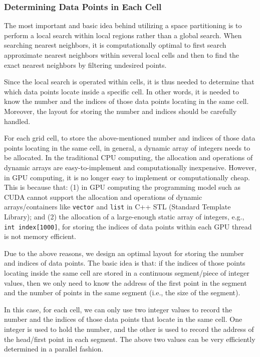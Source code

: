 \documentclass[final,5p,times,twocolumn,authoryear]{elsarticle}
\begin{document}
			\subsubsection{Determining Data Points in Each Cell}
			
			The most important and basic idea behind utilizing a space partitioning is 
			to perform a local search within local regions rather than a global search. 
			When searching nearest neighbors, it is computationally optimal to first 
			search approximate nearest neighbors within several local cells and then to 
			find the exact nearest neighbors by filtering undesired points. 
			
			Since the local search is operated within cells, it is thus needed to 
			determine that which data points locate inside a specific cell. In other 
			words, it is needed to know the number and the indices of those data points 
			locating in the same cell. Moreover, the layout for storing the number and 
			indices should be carefully handled.
			
			For each grid cell, to store the above-mentioned number and indices of those 
			data points locating in the same cell, in general, a dynamic array of 
			integers needs to be allocated. In the traditional CPU computing, the 
			allocation and operations of dynamic arrays are easy-to-implement and 
			computationally inexpensive. However, in GPU computing, it is no longer easy 
			to implement or computationally cheap. This is because that: (1) in GPU 
			computing the programming model such as CUDA cannot support the allocation 
			and operations of dynamic arrays/containers like \texttt{vector} and \texttt{list} in C++ STL 
			(Standard Template Library); and (2) the allocation of a large-enough static 
			array of integers, e.g., \texttt{int index[1000]}, for storing the indices of data 
			points within each GPU thread is not memory efficient. 
			
			Due to the above reasons, we design an optimal layout for storing the number 
			and indices of data points. The basic idea is that: if the indices of those 
			points locating inside the same cell are stored in a continuous 
			segment/piece of integer values, then we only need to know the address of 
			the first point in the segment and the number of points in the same segment 
			(i.e., the size of the segment).
			
			In this case, for each cell, we can only use two integer values to record 
			the number and the indices of those data points that locate in the same 
			cell. One integer is used to hold the number, and the other is used to 
			record the address of the head/first point in each segment. The above two 
			values can be very efficiently determined in a parallel fashion.
			
\end{document}
